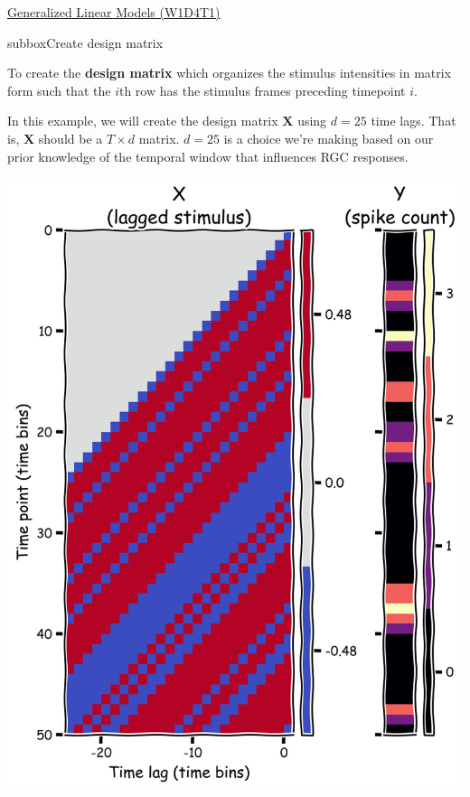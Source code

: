 \let\clearpage\relax
\begin{textbox}{\href{https://compneuro.neuromatch.io/tutorials/W1D4_GeneralizedLinearModels/student/W1D4_Tutorial1.html}{Generalized Linear Models (W1D4T1)} }
\begin{subbox}{subbox}{Create design matrix}
\scriptsize

To create the \textbf{design matrix} which organizes the stimulus intensities in matrix form such that the $i$th row has the stimulus frames preceding timepoint $i$.

In this example, we will create the design matrix $\mathbf{X}$ using $d=25$ time lags. That is, $\mathbf{X}$ should be a $T \times d$ matrix. $d = 25$  is a choice we're making based on our prior knowledge of the temporal window that influences RGC responses. 

\centering
\includegraphics[scale=0.13]{Figures/GLM/GLMFigure1.png}
\end{subbox}


\end{textbox}
